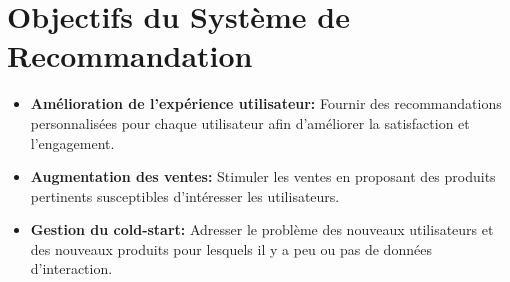 \documentclass[edit,12pt,a4paper,ChapStyle,oneside,doubleinterligne]{report}
\begin{document}
\section{Objectifs du Système de Recommandation}
\begin{itemize}
    \item \textbf{Amélioration de l'expérience utilisateur:} Fournir des recommandations personnalisées pour chaque utilisateur afin d'améliorer la satisfaction et l'engagement.
    \item \textbf{Augmentation des ventes:} Stimuler les ventes en proposant des produits pertinents susceptibles d'intéresser les utilisateurs.
    \item \textbf{Gestion du cold-start:} Adresser le problème des nouveaux utilisateurs et des nouveaux produits pour lesquels il y a peu ou pas de données d'interaction.
\end{itemize}
\end{document}
